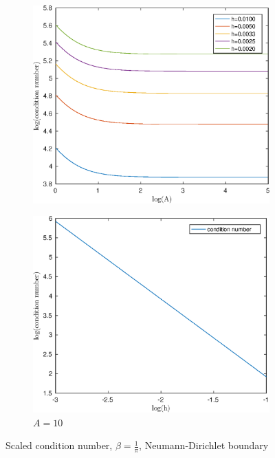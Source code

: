 \documentclass[12pt]{article}
\begin{document}
\begin{figure}[h!]
\centering
\begin{subfigure}{0.4\textwidth}
\includegraphics[width=\textwidth]{cond-A-pi-ND}
\caption{}
\end{subfigure}
\hfill
\begin{subfigure}{0.4\textwidth}
\includegraphics[width=\textwidth]{cond-N-pi-ND}
\caption{$A=10$}
\end{subfigure}
\caption{Scaled condition number, $\beta=\frac{1}{\pi}$, Neumann-Dirichlet boundary}
\end{figure}
\end{document}
